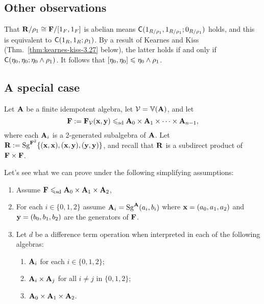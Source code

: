 \subsection{Other observations}
That $\mathbf{R}/\rho_1 \cong \mathbf{F} /[1_{F},1_{F}]$ is abelian means
$\mathsf{C}(1_{R/\rho_1}, 1_{R/\rho_1}; 0_{R/\rho_1})$ holds, and this is equivalent to
$\mathsf{C}(1_R, 1_R; \rho_1)$. By a result of Kearnes and Kiss
(Thm.~\ref{thm:kearnes-kiss-3.27} below), the latter
holds if and only if $\mathsf{C}(\eta_0, \eta_0; \eta_0\wedge \rho_1)$.
It follows that $[\eta_0, \eta_0]\leqslant \eta_0 \wedge \rho_1$.
\bigskip

\subsection{A special case}
Let $\mathbf{A}$ be a finite idempotent algebra, let $\mathcal{V} = \operatorname{\mathbb{V}}(\mathbf{A})$, and let
\[\mathbf{F}:= \mathbf{F}_{\mathcal{V}}(\mathbf{x},\mathbf{y}) \leqslant_{\mathrm{sd}} \mathbf{A}_0 \times \mathbf{A}_1 \times \cdots \times \mathbf{A}_{n-1},\]
where each $\mathbf{A}_i$ is a 2-generated subalgebra of $\mathbf{A}$.
Let $\mathbf{R} := \operatorname{Sg}^{\mathbf{F}^2} \{(\mathbf{x}, \mathbf{x}), (\mathbf{x}, \mathbf{y}), (\mathbf{y}, \mathbf{y})\}$,
and recall that $\mathbf{R}$ is a subdirect product of $\mathbf{F} \times \mathbf{F}$.

Let's see what we can prove under the following
simplifying assumptions:
\begin{enumerate}
\item Assume $\mathbf{F} \leqslant_{\mathrm{sd}} \mathbf{A}_0 \times \mathbf{A}_1 \times \mathbf{A}_2$,
\item For each $i\in \{0,1,2\}$ assume $\mathbf{A}_i = \operatorname{Sg}^{\mathbf{A}}(a_i, b_i)$ where
  $\mathbf{x} = (a_0,a_1,a_2)$ and $\mathbf{y} = (b_0,b_1,b_2)$ are the generators of $\mathbf{F}$.
\item Let $d$ be a difference term operation when interpreted in
  each of the following algebras:
\begin{enumerate}
  \item \label{item:13} $\mathbf{A}_i$ for each $i\in \{0,1,2\}$;
  \item \label{item:14}$\mathbf{A}_i\times \mathbf{A}_j$ for all $i \neq j$ in $\{0,1,2\}$;
  \item \label{item:15} $\mathbf{A}_0\times \mathbf{A}_1 \times \mathbf{A}_2$.
\end{enumerate}
\end{enumerate}

